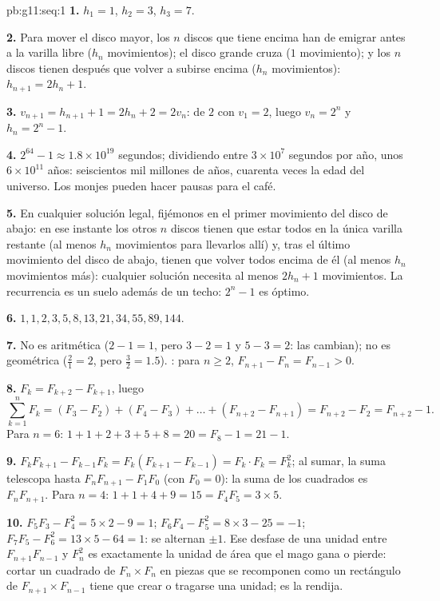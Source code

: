 \begin{solution}{pb:g11:seq:1}
\textbf{1.} $h_1 = 1$, $h_2 = 3$, $h_3 = 7$.

\textbf{2.} Para mover el disco mayor, los $n$ discos que tiene encima han
de emigrar antes a la varilla libre ($h_n$ movimientos); el disco grande
cruza ($1$ movimiento); y los $n$ discos tienen después que volver a
subirse encima ($h_n$ movimientos): $h_{n+1} = 2h_n + 1$.

\textbf{3.} $v_{n+1} = h_{n+1} + 1 = 2h_n + 2 = 2v_n$:  de  $2$ con $v_1 = 2$, luego $v_n = 2^n$ y
$h_n = 2^n - 1$.

\textbf{4.} $2^{64} - 1 \approx 1.8 \times 10^{19}$ segundos; dividiendo
entre $3 \times 10^7$ segundos por año, unos $6 \times 10^{11}$ años:
seiscientos mil millones de años, cuarenta veces la edad del universo. Los
monjes pueden hacer pausas para el café.

\textbf{5.} En cualquier solución legal, fijémonos en el primer movimiento
del disco de abajo: en ese instante los otros $n$ discos tienen que estar
todos en la única varilla restante (al menos $h_n$ movimientos para
llevarlos allí) y, tras el último movimiento del disco de abajo, tienen
que volver todos encima de él (al menos $h_n$ movimientos más): cualquier
solución necesita al menos $2h_n + 1$ movimientos. La recurrencia es un
suelo además de un techo: $2^n - 1$ es óptimo.

\textbf{6.} $1, 1, 2, 3, 5, 8, 13, 21, 34, 55, 89, 144$.

\textbf{7.} No es aritmética ($2 - 1 = 1$, pero $3 - 2 = 1$ y
$5 - 3 = 2$: las  cambian); no es geométrica ($\frac21 = 2$,
pero $\frac32 = 1.5$). : para $n \geq 2$,
$F_{n+1} - F_n = F_{n-1} > 0$.

\textbf{8.} $F_k = F_{k+2} - F_{k+1}$, luego
\[
\sum_{k=1}^{n} F_k = (F_3 - F_2) + (F_4 - F_3) + \dots +
(F_{n+2} - F_{n+1}) = F_{n+2} - F_2 = F_{n+2} - 1 .
\]
Para $n = 6$: $1 + 1 + 2 + 3 + 5 + 8 = 20 = F_8 - 1 = 21 - 1$.

\textbf{9.} $F_k F_{k+1} - F_{k-1} F_k = F_k (F_{k+1} - F_{k-1}) =
F_k \cdot F_k = F_k^2$; al sumar, la suma telescopa hasta
$F_n F_{n+1} - F_1 F_0$ (con $F_0 = 0$): la suma de los cuadrados es
$F_n F_{n+1}$. Para $n = 4$: $1 + 1 + 4 + 9 = 15 = F_4 F_5 =
3 \times 5$.

\textbf{10.} $F_5 F_3 - F_4^2 = 5 \times 2 - 9 = 1$;
$F_6 F_4 - F_5^2 = 8 \times 3 - 25 = -1$;
$F_7 F_5 - F_6^2 = 13 \times 5 - 64 = 1$: se alternan $\pm 1$. Ese
desfase de una unidad entre $F_{n+1} F_{n-1}$ y $F_n^2$ es exactamente la
unidad de área que el mago gana o pierde: cortar un cuadrado de
$F_n \times F_n$ en piezas que se recomponen como un rectángulo de
$F_{n+1} \times F_{n-1}$ tiene que crear o tragarse una unidad; es la
rendija.


\end{solution}

